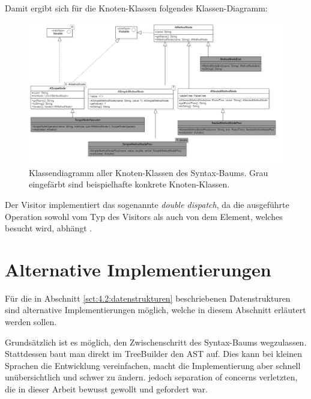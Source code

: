 Damit ergibt sich für die Knoten-Klassen folgendes Klassen-Diagramm:

\begin{figure}[H]
\centering\includegraphics[width=.9\textwidth]{images/kapitel4/classDiagram1.png}
\caption{Klassendiagramm aller Knoten-Klassen des Syntax-Baums. Grau eingefärbt sind beispielhafte konkrete Knoten-Klassen.}
\label{fig:class-diagram1}
\end{figure}

Der Visitor implementiert das sogenannte \emph{double dispatch}, da die ausgeführte Operation sowohl vom Typ des Visitors als auch von dem Element, welches besucht wird, abhängt \cite{www:visitor-sourcemaking}.

\section{Alternative Implementierungen}\label{sct:4.4:alternativen}
Für die in Abschnitt \ref{sct:4.2:datenstrukturen} beschriebenen Datenstrukturen sind alternative Implementierungen möglich, welche in diesem Abschnitt erläutert werden sollen.

Grundsätzlich ist es möglich, den Zwischenschritt des Syntax-Baums wegzulassen. Stattdessen baut man direkt im TreeBuilder den AST auf. Dies kann bei kleinen Sprachen die Entwicklung vereinfachen, macht die Implementierung aber schnell unübersichtlich und schwer zu ändern.
jedoch separation of concerns verletzten, die in dieser Arbeit bewusst gewollt und gefordert war.


